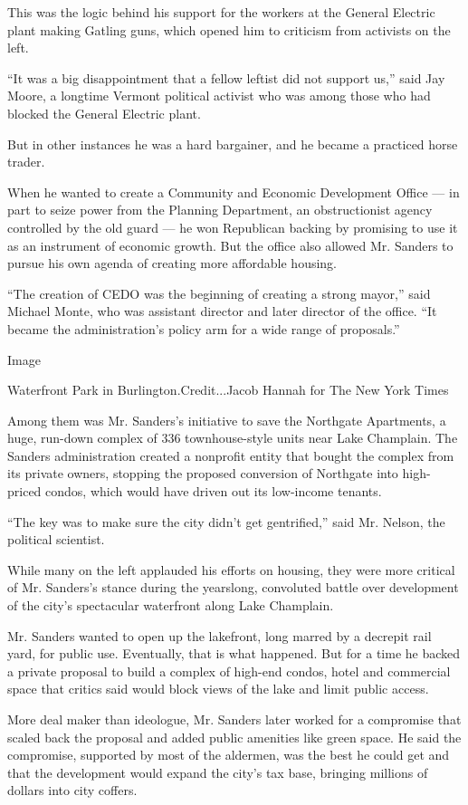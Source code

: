 This was the logic behind his support for the workers at the General
Electric plant making Gatling guns, which opened him to criticism from
activists on the left.

``It was a big disappointment that a fellow leftist did not support
us,'' said Jay Moore, a longtime Vermont political activist who was
among those who had blocked the General Electric plant.

But in other instances he was a hard bargainer, and he became a
practiced horse trader.

When he wanted to create a Community and Economic Development Office ---
in part to seize power from the Planning Department, an obstructionist
agency controlled by the old guard --- he won Republican backing by
promising to use it as an instrument of economic growth. But the office
also allowed Mr. Sanders to pursue his own agenda of creating more
affordable housing.

``The creation of CEDO was the beginning of creating a strong mayor,''
said Michael Monte, who was assistant director and later director of the
office. ``It became the administration's policy arm for a wide range of
proposals.''

Image

Waterfront Park in Burlington.Credit...Jacob Hannah for The New York
Times

Among them was Mr. Sanders's initiative to save the Northgate
Apartments, a huge, run-down complex of 336 townhouse-style units near
Lake Champlain. The Sanders administration created a nonprofit entity
that bought the complex from its private owners, stopping the proposed
conversion of Northgate into high-priced condos, which would have driven
out its low-income tenants.

``The key was to make sure the city didn't get gentrified,'' said Mr.
Nelson, the political scientist.

While many on the left applauded his efforts on housing, they were more
critical of Mr. Sanders's stance during the yearslong, convoluted battle
over development of the city's spectacular waterfront along Lake
Champlain.

Mr. Sanders wanted to open up the lakefront, long marred by a decrepit
rail yard, for public use. Eventually, that is what happened. But for a
time he backed a private proposal to build a complex of high-end condos,
hotel and commercial space that critics said would block views of the
lake and limit public access.

More deal maker than ideologue, Mr. Sanders later worked for a
compromise that scaled back the proposal and added public amenities like
green space. He said the compromise, supported by most of the aldermen,
was the best he could get and that the development would expand the
city's tax base, bringing millions of dollars into city coffers.

